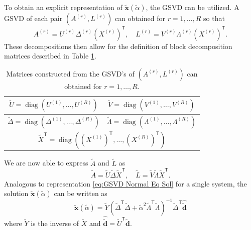 \documentclass[12pt]{article}
\newcommand{\dVec}{\mathbf{d}}	%
\newcommand{\xVec}{\mathbf{x}}	%
\newcommand{\trans}[1]{{#1}^\mathsf{T}}	%
\newcommand{\inv}[1]{{#1}^{-1}}	%
\DeclareMathOperator{\diag}{diag}	%
\newcommand{\regparam}{\alpha}  %
\newcommand{\regparamBig}{\widetilde{\regparam}}   %
\newcommand{\xBig}{\widetilde{\xVec}}	%
\newcommand{\dBig}{\widetilde{\dVec}}	%
\newcommand{\ABig}{\widetilde{A}}	%
\newcommand{\LBig}{\widetilde{L}}	%
\newcommand{\svd}[1]{\widehat{#1}}	%
\begin{document}
To obtain an explicit representation of $\xBig(\regparamBig)$, the GSVD can be utilized. A GSVD of each pair $(A^{(r)},L^{(r)})$ can obtained for $r = 1,\ldots,R$ so that
\begin{equation}
\label{eq:Mulitple GSVD}
    A^{(r)} = U^{(r)}\Delta^{(r)}\trans{\left(X^{(r)}\right)}, \quad L^{(r)} = V^{(r)}\Lambda^{(r)}\trans{\left(X^{(r)}\right)}.
\end{equation}
These decompositions then allow for the definition of block decomposition matrices described in Table \ref{tab:Block GSVD Matrices}.
\begin{table}[ht!]
  \begin{center}
    \caption{Matrices constructed from the GSVD's of $(A^{(r)},L^{(r)})$ can obtained for $r = 1,\ldots,R$.}
    \label{tab:Block GSVD Matrices}
    \begin{tabular}{|c|c|}
    \hline
    $\widetilde{U} = \diag\left(U^{(1)},\ldots,U^{(R)}\right)$ & $\widetilde{V} = \diag\left(V^{(1)},\ldots,V^{(R)}\right)$ \\
    \hline
    $\widetilde{\Delta} = \diag\left(\Delta^{(1)},\ldots,\Delta^{(R)}\right)$ & $\widetilde{\Lambda} = \diag\left(\Lambda^{(1)},\ldots,\Lambda^{(R)}\right)$ \\
    \hline
    \multicolumn{2}{|c|}{$\trans{\widetilde{X}} = \diag\left(\trans{\left(X^{(1)}\right)},\ldots,\trans{\left(X^{(R)}\right)}\right)$} \\
    \hline
    \end{tabular}
  \end{center}
\end{table}
We are now able to express $\ABig$ and $\LBig$ as
\begin{equation}
    \label{eq:Adapted A and L GSVD}
    \ABig = \widetilde{U}\widetilde{\Delta}\trans{\widetilde{X}}, \quad \LBig = \widetilde{V}\widetilde{\Lambda}\trans{\widetilde{X}}.
\end{equation}
Analogous to representation \eqref{eq:GSVD Normal Eq Sol} for a single system, the solution $\xBig(\regparamBig)$ can be written as 
\begin{equation}
    \label{eq:GSVD Big Normal Eq Sol}
    \xBig(\regparamBig) = \widetilde{Y}\inv{\left(\trans{\widetilde{\Delta}}\widetilde{\Delta} + \widetilde{\regparam}^2 \trans{\widetilde{\Lambda}}\widetilde{\Lambda}\right)}\trans{\widetilde{\Delta}}\svd{\dBig}
\end{equation}
where $\widetilde{Y}$ is the inverse of $\widetilde{X}$ and $\svd{\dBig} = \trans{\widetilde{U}}\dBig$. \par
\end{document}
